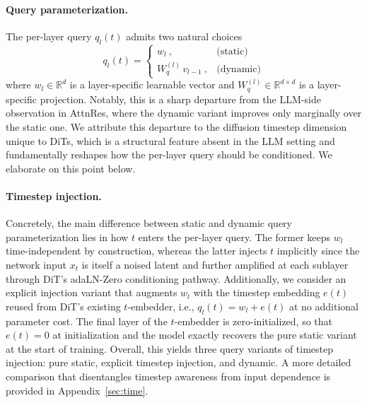 \documentclass{llmxive}
\begin{document}
\paragraph{Query parameterization.} The per-layer query $q_l(t)$ admits two natural choices
\begin{equation}
    q_l(t) = \begin{cases}
        w_l \ , & \text{(static)} \\[2pt]
        W_q^{(l)}\, v_{l-1} \ , & \text{(dynamic)}
    \end{cases}
\end{equation}
where $w_l \in \mathbb{R}^d$ is a layer-specific learnable vector and $W_q^{(l)} \in \mathbb{R}^{d \times d}$ is a layer-specific projection. Notably, this is a sharp departure from the LLM-side observation in AttnRes, where the dynamic variant improves only marginally over the static one. We attribute this departure to the diffusion timestep dimension unique to DiTs, which is a structural feature absent in the LLM setting and fundamentally reshapes how the per-layer query should be conditioned. We elaborate on this point below.

\paragraph{Timestep injection.} Concretely, the main difference between static and dynamic query parameterization lies in how $t$ enters the per-layer query. The former keeps $w_l$ time-independent by construction, whereas the latter injects $t$ implicitly since the network input $x_t$ is itself a noised latent and further amplified at each sublayer through DiT's adaLN-Zero conditioning pathway. Additionally, we consider an explicit injection variant that augments $w_l$ with the timestep embedding $e(t)$ reused from DiT's existing $t$-embedder, i.e., $q_l(t) = w_l + e(t)$ at no additional parameter cost. The final layer of the $t$-embedder is zero-initialized, so that $e(t)=0$ at initialization and the model exactly recovers the pure static variant at the start of training. Overall, this yields three query variants of timestep injection: pure static, explicit timestep injection, and dynamic. A more detailed comparison that disentangles timestep awareness from input dependence is provided in Appendix~\ref{sec:time}.
\end{document}
